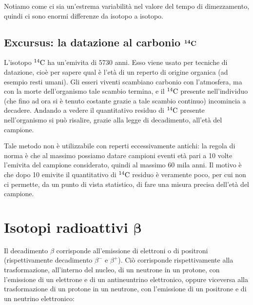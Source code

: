 Notiamo come ci sia un'estrema variabilità nel valore del tempo di dimezzamento, quindi ci sono enormi differenze da isotopo a isotopo.

\subsection[Excursus: la datazione al carbonio \texorpdfstring{$\rm ^{14}C$}{\textonesuperior\textfoursuperior C}]
{Excursus: la datazione al carbonio $\boldsymbol{\rm ^{14}C}$}

L'isotopo $\rm ^{14}C$ ha un'emivita di 5730 anni. Esso viene usato per tecniche di datazione, cioè per sapere qual è l'età di un reperto di origine organica (ad esempio resti umani). Gli esseri viventi scambiano carbonio con l'atmosfera, ma con la morte dell'organismo tale scambio termina, e il $\rm ^{14}C$ presente nell'individuo (che fino ad ora si è tenuto costante grazie a tale scambio continuo) incomincia a decadere. Andando a vedere il quantitativo residuo di $\rm ^{14}C$ presente nell'organismo si può risalire, grazie alla legge di decadimento, all'età del campione.

Tale metodo non è utilizzabile con reperti eccessivamente antichi: la regola di norma è che al massimo possiamo datare campioni eventi età pari a 10 volte l'emivita del campione considerato, quindi al massimo 60 mila anni. Il motivo è che dopo 10 emivite il quantitativo di $\rm ^{14}C$ residuo è veramente poco, per cui non ci permette, da un punto di vista statistico, di fare una misura precisa dell'età del campione.


\section[Isotopi radioattivi \texorpdfstring{$\beta$}{\textbeta}]
{Isotopi radioattivi $\boldsymbol{\beta}$}

Il decadimento $\beta$ corrisponde all'emissione di elettroni o di positroni (rispettivamente decadimento $\beta^-$ e $\beta^+$). Ciò corrisponde rispettivamente alla trasformazione, all'interno del nucleo, di un neutrone in un protone, con l'emissione di un elettrone e di un antineuntrino elettronico, oppure viceversa alla trasformazione di un protone in un neutrone, con l'emissione di un positrone e di un neutrino elettronico:

\vspace{-0.3cm}

